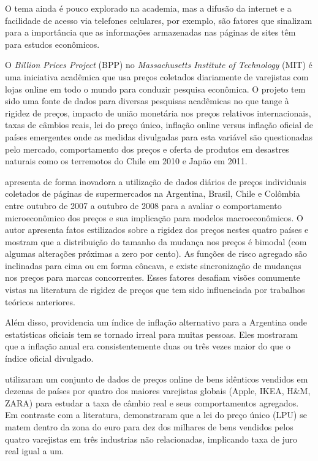 \documentclass[twoside,a4paper,11pt]{report}
\begin{document}
O tema ainda é pouco explorado na academia, mas a difusão da internet e a facilidade de acesso via telefones celulares, por exemplo, são fatores que sinalizam para a importância que as informações armazenadas nas páginas de sites têm para estudos econômicos. 

O \emph{Billion Prices Project} (BPP) no \emph{Massachusetts Institute of Technology} (MIT) é uma iniciativa acadêmica que usa preços coletados diariamente de varejistas com lojas online em todo o mundo para conduzir pesquisa econômica. O projeto tem sido uma fonte de dados para diversas pesquisas acadêmicas no que tange à rigidez de preços, impacto de união monetária nos preços relativos internacionais, taxas de câmbios reais, lei do preço único, inflação online versus inflação oficial de países emergentes onde as medidas divulgadas para esta variável são questionadas pelo mercado, comportamento dos preços e oferta de produtos em desastres naturais como os terremotos do Chile em 2010 e Japão em 2011.

\citet{cavallo2010scraped} apresenta de forma inovadora a utilização de dados diários de preços individuais coletados de páginas de supermercados na Argentina, Brasil, Chile e Colômbia entre outubro de 2007 a outubro de 2008 para a avaliar o comportamento microeconômico dos preços e sua implicação para modelos macroeconômicos. O autor apresenta fatos estilizados sobre a rigidez dos preços nestes quatro países e mostram que a distribuição do tamanho da mudança nos preços é bimodal (com algumas alterações próximas a zero por cento). As funções de risco agregado são inclinadas para cima ou em forma côncava, e existe sincronização de mudanças nos preços para marcas concorrentes. Esses fatores desafiam visões comumente vistas na literatura de rigidez de preços que tem sido influenciada por trabalhos teóricos anteriores. 
  
Além disso, \citet{cavallo2010scraped} providencia um índice de inflação alternativo para a Argentina onde estatísticas oficiais tem se tornado irreal para muitas pessoas. Eles mostraram que a inflação anual era consistentemente duas ou três vezes maior do que o índice oficial divulgado. 

 \citet{cavallo2012currency} utilizaram um conjunto de dados de preços online de bens idênticos vendidos em dezenas de países por quatro dos maiores varejistas globais (Apple, IKEA, H\&M, ZARA) para estudar a taxa de câmbio real e seus comportamentos agregados. Em contraste com a literatura, demonstraram que a lei do preço único (LPU) se matem dentro da zona do euro para dez dos milhares de bens vendidos pelos quatro varejistas em três industrias não relacionadas, implicando taxa de juro real igual a um.
\end{document}
